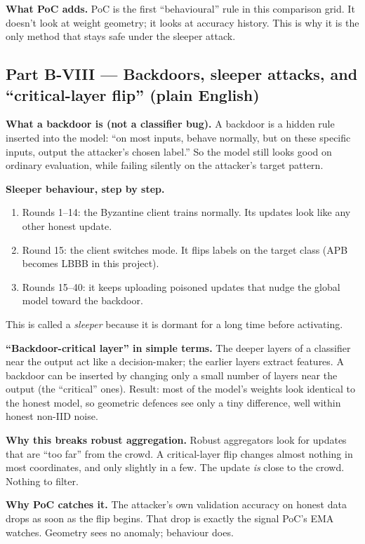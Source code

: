 \documentclass[11pt,a4paper]{article}
\begin{document}
\textbf{What PoC adds.}
PoC is the first ``behavioural'' rule in this comparison grid. It doesn't look
at weight geometry; it looks at accuracy history. This is why it is the only
method that stays safe under the sleeper attack.

\subsection{Part B-VIII --- Backdoors, sleeper attacks, and ``critical-layer flip'' (plain English)}
\label{sec:backdoor-conceptual}

\textbf{What a backdoor is (not a classifier bug).}
A backdoor is a hidden rule inserted into the model: ``on most inputs, behave
normally, but on these specific inputs, output the attacker's chosen label.''
So the model still looks good on ordinary evaluation, while failing silently
on the attacker's target pattern.

\textbf{Sleeper behaviour, step by step.}
\begin{enumerate}
\item Rounds 1--14: the Byzantine client trains normally. Its updates look
like any other honest update.
\item Round 15: the client switches mode. It flips labels on the target class
(APB becomes LBBB in this project).
\item Rounds 15--40: it keeps uploading poisoned updates that nudge the global
model toward the backdoor.
\end{enumerate}
This is called a \emph{sleeper} because it is dormant for a long time before
activating.

\textbf{``Backdoor-critical layer'' in simple terms.}
The deeper layers of a classifier near the output act like a decision-maker;
the earlier layers extract features. A backdoor can be inserted by changing
only a small number of layers near the output (the ``critical'' ones). Result:
most of the model's weights look identical to the honest model, so geometric
defences see only a tiny difference, well within honest non-IID noise.

\textbf{Why this breaks robust aggregation.}
Robust aggregators look for updates that are ``too far'' from the crowd. A
critical-layer flip changes almost nothing in most coordinates, and only
slightly in a few. The update \emph{is} close to the crowd. Nothing to filter.

\textbf{Why PoC catches it.}
The attacker's own validation accuracy on honest data drops as soon as the flip
begins. That drop is exactly the signal PoC's EMA watches. Geometry sees no
anomaly; behaviour does.
\end{document}

